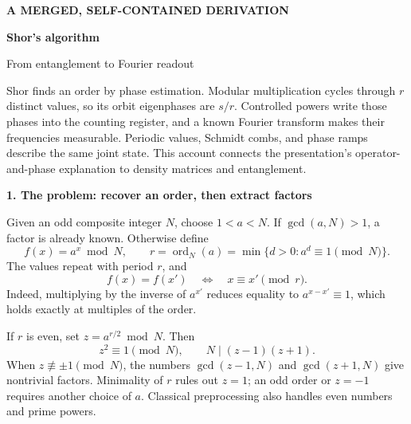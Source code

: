\documentclass[11pt,a4paper]{article}
\newcommand{\lead}[1]{\par\vspace{3pt}\textbf{\color{ink}#1}\par}
\begin{document}
\color{ink}\fontsize{10.5}{13.2}\selectfont


{\small\color{accent}\textbf{A MERGED, SELF-CONTAINED DERIVATION}}\par
\vspace{5pt}
{\Huge\bfseries Shor's algorithm}\par
\vspace{3pt}
{\Large From entanglement to Fourier readout}\par
\vspace{8pt}
Shor finds an order by phase estimation. Modular multiplication cycles through \(r\) distinct values, so its orbit eigenphases are \(s/r\). Controlled powers write those phases into the counting register, and a known Fourier transform makes their frequencies measurable. Periodic values, Schmidt combs, and phase ramps describe the same joint state. This account connects the presentation's operator-and-phase explanation to density matrices and entanglement.

\lead{1. The problem: recover an order, then extract factors}
Given an odd composite integer \(N\), choose \(1<a<N\). If \(\gcd(a,N)>1\), a factor is already known. Otherwise define
\[
f(x)=a^x\bmod N,\qquad
r=\operatorname{ord}_N(a)=\min\{d>0:a^d\equiv1\pmod N\}.
\]
The values repeat with period \(r\), and
\[
f(x)=f(x')\quad\Longleftrightarrow\quad x\equiv x'\pmod r.
\]
Indeed, multiplying by the inverse of \(a^{x'}\) reduces equality to \(a^{x-x'}\equiv1\), which holds exactly at multiples of the order.

If \(r\) is even, set \(z=a^{r/2}\bmod N\). Then
\[
z^2\equiv1\pmod N,\qquad N\mid(z-1)(z+1).
\]
When \(z\not\equiv\pm1\pmod N\), the numbers \(\gcd(z-1,N)\) and \(\gcd(z+1,N)\) give nontrivial factors. Minimality of \(r\) rules out \(z=1\); an odd order or \(z=-1\) requires another choice of \(a\). Classical preprocessing also handles even numbers and prime powers.
\end{document}
